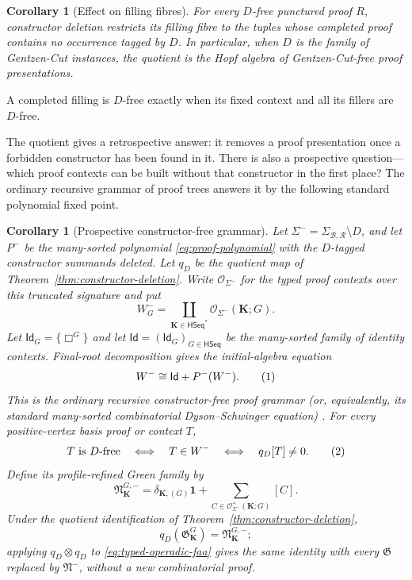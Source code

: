 \documentclass[10pt,a4paper]{article}
\theoremstyle{plain}
\newtheorem{corollary}[theorem]{Corollary}
\theoremstyle{definition}
\theoremstyle{remark}
\newcommand{\Base}{\mathcal B}
\newcommand{\Rules}{\mathcal R}
\newcommand{\HSeq}{\mathsf{HSeq}}
\newcommand{\one}{\mathbf 1}
\newcommand{\eqtag}{\refstepcounter{equation}\tag{\theequation}}
\begin{document}
\begin{corollary}[Effect on filling fibres]
\label{cor:constructor-deletion-filling}
For every \(D\)-free punctured proof \(R\), constructor deletion restricts
its filling fibre to the tuples whose completed proof contains no
occurrence tagged by \(D\).  In particular, when \(D\) is the family of
Gentzen-Cut instances, the quotient is the Hopf algebra of
Gentzen-Cut-free proof presentations.
\end{corollary}

A completed filling is \(D\)-free exactly when its fixed context and all
its fillers are \(D\)-free.

The quotient gives a retrospective answer: it removes a proof
presentation once a forbidden constructor has been found in it.  There is
also a prospective question---which proof contexts can be built without
that constructor in the first place?  The ordinary recursive grammar of
proof trees answers it by the following standard polynomial fixed point.

\begin{corollary}[Prospective constructor-free grammar]
\label{prop:constructor-truncation-dse}
Let
\(\Sigma^-=\Sigma_{\Base,\Rules}\setminus D\), and let
\(P^-\) be the many-sorted polynomial
\eqref{eq:proof-polynomial} with the \(D\)-tagged constructor summands
deleted.  Let \(q_D\) be the quotient map of
Theorem~\ref{thm:constructor-deletion}.  Write
\(\mathcal O_{\Sigma^-}\) for the typed proof contexts
over this truncated signature and put
\[
 W_G^-=\coprod_{\mathbf K\in\HSeq^\ast}
          \mathcal O_{\Sigma^-}(\mathbf K;G).
\]
Let \(\mathsf{Id}_G=\{\Box^G\}\) and let
\(\mathsf{Id}=(\mathsf{Id}_G)_{G\in\HSeq}\) be the many-sorted family of
identity contexts.  Final-root decomposition gives the initial-algebra
equation
 \[
                 W^-\cong\mathsf{Id}+P^-(W^-).
\eqtag\label{eq:constructor-truncation-dse}
\]
This is the ordinary recursive constructor-free proof grammar (or,
equivalently, its standard many-sorted combinatorial Dyson--Schwinger
equation) \cite{kock2017}.  For every positive-vertex
basis proof or context \(T\),
\[
 T\text{ is \(D\)-free}
 \quad\Longleftrightarrow\quad
 T\in W^-
 \quad\Longleftrightarrow\quad
 q_D[T]\ne0 .
\eqtag\label{eq:constructor-free-three-way}
\]
Define its profile-refined Green family by
\[
 \mathfrak N_{\mathbf K}^{G,-}
   =\delta_{\mathbf K,(G)}\one+
      \sum_{C\in\mathcal O_{\Sigma^-}^+(\mathbf K;G)}[C].
\]
Under the quotient identification of
Theorem~\ref{thm:constructor-deletion},
\[
             q_D(\mathfrak G_{\mathbf K}^{G})
                =\mathfrak N_{\mathbf K}^{G,-};
\]
applying \(q_D\otimes q_D\) to
\eqref{eq:typed-operadic-faa} gives the same identity with every
\(\mathfrak G\) replaced by \(\mathfrak N^{-}\), without a new
combinatorial proof.
\end{corollary}
\end{document}
